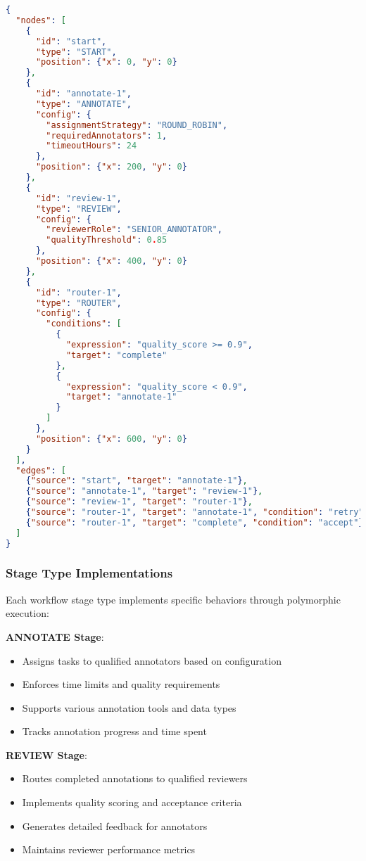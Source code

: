 \begin{lstlisting}[language=json, caption=Example Workflow Definition]
{
  "nodes": [
    {
      "id": "start",
      "type": "START",
      "position": {"x": 0, "y": 0}
    },
    {
      "id": "annotate-1",
      "type": "ANNOTATE",
      "config": {
        "assignmentStrategy": "ROUND_ROBIN",
        "requiredAnnotators": 1,
        "timeoutHours": 24
      },
      "position": {"x": 200, "y": 0}
    },
    {
      "id": "review-1", 
      "type": "REVIEW",
      "config": {
        "reviewerRole": "SENIOR_ANNOTATOR",
        "qualityThreshold": 0.85
      },
      "position": {"x": 400, "y": 0}
    },
    {
      "id": "router-1",
      "type": "ROUTER", 
      "config": {
        "conditions": [
          {
            "expression": "quality_score >= 0.9",
            "target": "complete"
          },
          {
            "expression": "quality_score < 0.9",
            "target": "annotate-1"
          }
        ]
      },
      "position": {"x": 600, "y": 0}
    }
  ],
  "edges": [
    {"source": "start", "target": "annotate-1"},
    {"source": "annotate-1", "target": "review-1"},
    {"source": "review-1", "target": "router-1"},
    {"source": "router-1", "target": "annotate-1", "condition": "retry"},
    {"source": "router-1", "target": "complete", "condition": "accept"}
  ]
}
\end{lstlisting}

\subsubsection{Stage Type Implementations}

Each workflow stage type implements specific behaviors through polymorphic execution:

\textbf{ANNOTATE Stage}:
\begin{itemize}
    \item Assigns tasks to qualified annotators based on configuration
    \item Enforces time limits and quality requirements
    \item Supports various annotation tools and data types
    \item Tracks annotation progress and time spent
\end{itemize}

\textbf{REVIEW Stage}:
\begin{itemize}
    \item Routes completed annotations to qualified reviewers
    \item Implements quality scoring and acceptance criteria
    \item Generates detailed feedback for annotators
    \item Maintains reviewer performance metrics
\end{itemize}

